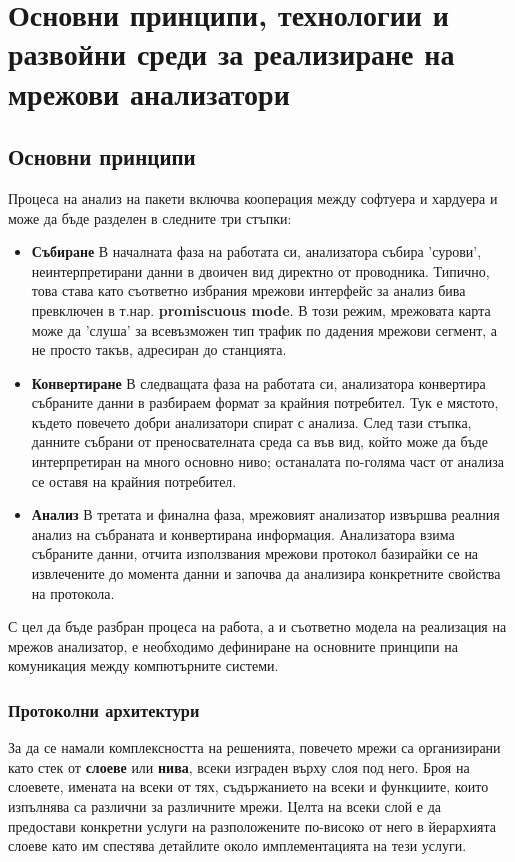 \documentclass[12pt,a4paper,oneside]{book}
\begin{document}
\section{Основни принципи, технологии и развойни среди за реализиране на мрежови
анализатори}

\subsection{Основни принципи}
Процеса на анализ на пакети включва кооперация между софтуера и хардуера и може
да бъде разделен в следните три стъпки:

\begin{itemize}
  \item
    \textbf{Събиране} В началната фаза на работата си, анализатора събира
    'сурови', неинтерпретирани данни в двоичен вид директно от проводника.
    Типично, това става като съответно избрания мрежови интерфейс за анализ
    бива превключен в т.нар.  \textbf{promiscuous mode}. В този режим, мрежовата карта
    може да 'слуша' за всевъзможен тип трафик по дадения мрежови сегмент, а не
    просто такъв, адресиран до станцията.
  \item
    \textbf{Конвертиране} В следващата фаза на работата си, анализатора
    конвертира събраните данни в разбираем формат за крайния потребител. Тук е
    мястото, където повечето добри анализатори спират с анализа. След тази
    стъпка, данните събрани от преносвателната среда са във вид, който може да
    бъде интерпретиран на много основно ниво; останалата по-голяма част от
    анализа се оставя на крайния потребител.
  \item
    \textbf{Анализ} В третата и финална фаза, мрежовият анализатор извършва
    реалния анализ на събраната и конвертирана информация. Анализатора взима
    събраните данни, отчита използвания мрежови протокол базирайки се на
    извлечените до момента данни и започва да анализира конкретните свойства на
    протокола.
\end{itemize}

С цел да бъде разбран процеса на работа, а и съответно модела на реализация на
мрежов анализатор, е необходимо дефиниране на основните принципи на
комуникация между компютърните системи.

\subsubsection{Протоколни архитектури}

За да се намали комплексността на решенията, повечето мрежи са организирани като
стек от \textbf{слоеве} или \textbf{нива}, всеки изграден върху слоя под него.
Броя на слоевете, имената на всеки от тях, съдържанието на всеки и функциите,
които изпълнява са различни за различните мрежи. Целта на всеки слой е да
предостави конкретни услуги на разположените по-високо от него в йерархията
слоеве като им спестява детайлите около имплементацията на тези услуги. 
\end{document}
